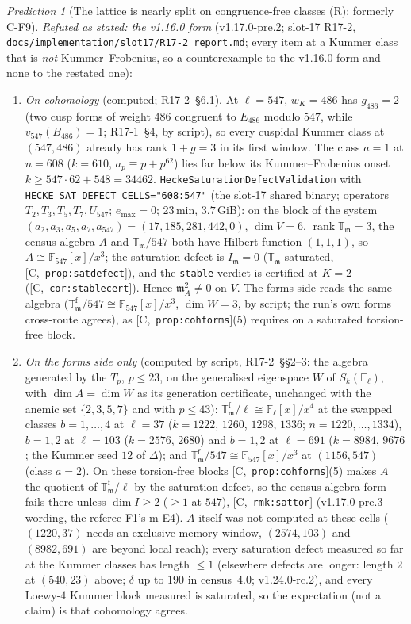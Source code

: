 \documentclass[11pt]{article}
\theoremstyle{remark}
\newtheorem{prediction}[theorem]{Prediction}
\newcommand{\F}{\mathbb{F}}
\newcommand{\Fl}{\F_\ell}
\DeclareMathOperator{\rank}{rank}
\newcommand{\T}{\mathbb{T}}
\newcommand{\m}{\mathfrak{m}}
\newcommand{\HA}[1]{[C,~\texttt{#1}]}      %
\begin{document}
\begin{prediction}[The lattice is nearly split on congruence-free classes (R); formerly C-F9]
\emph{Refuted as stated: the v1.16.0 form} (v1.17.0-pre.2; slot-17 R17-2, \texttt{docs/implementation/slot17/R17-2\_report.md}; every item at a Kummer class
that is \emph{not} Kummer--Frobenius, so a counterexample to the v1.16.0 form and none to the restated one):
\begin{enumerate}
\item \emph{On cohomology} (computed; R17-2~\S6.1). At $\ell=547$, $w_K=486$ has $g_{486}=2$ (two cusp forms of weight $486$ congruent to $E_{486}$ modulo
  $547$, while $v_{547}(B_{486})=1$; R17-1~\S4, by script), so every cuspidal Kummer class at $(547,486)$ already has rank $1+g=3$ in its first window. The
  class $a=1$ at $n=608$ ($k=610$, $a_p\equiv p+p^{62}$) lies far below its Kummer--Frobenius onset $k\ge547\cdot62+548=34462$.
  \texttt{HeckeSaturationDefectValidation} with \texttt{HECKE\_SAT\_DEFECT\_CELLS="608:547"} (the slot-17 shared binary; operators $T_2,T_3,T_5,T_7,U_{547}$;
  $e_{\max}=0$; 23\,min, $3.7$\,GiB): on the block of the system $(a_2,a_3,a_5,a_7,a_{547})=(17,185,281,442,0)$, $\dim V=6$, $\rank\T_\m=3$, the census algebra
  $A$ and $\T_\m/547$ both have Hilbert function $(1,1,1)$, so $A\cong\F_{547}[x]/x^3$; the saturation defect is $I_\m=0$ ($\T_\m$ saturated, \HA{prop:satdefect}),
  and the \texttt{stable} verdict is certified at $K=2$ (\HA{cor:stablecert}). Hence $\m_A^2\ne0$ on $V$. The forms side reads the same algebra
  ($\T^{\mathrm f}_\m/547\cong\F_{547}[x]/x^3$, $\dim W=3$, by script; the run's own forms cross-route agrees), as \HA{prop:cohforms}(5) requires on a saturated
  torsion-free block.
\item \emph{On the forms side only} (computed by script, R17-2~\S\S2--3: the algebra generated by the $T_p$, $p\le23$, on the generalised eigenspace $W$ of
  $S_k(\Fl)$, with $\dim A=\dim W$ as its generation certificate, unchanged with the anemic set $\{2,3,5,7\}$ and with $p\le43$): $\T^{\mathrm f}_\m/\ell\cong
  \Fl[x]/x^4$ at the swapped classes $b=1,\dots,4$ at $\ell=37$ ($k=1222$, $1260$, $1298$, $1336$; $n=1220,\dots,1334$), $b=1,2$ at $\ell=103$ ($k=2576$, $2680$)
  and $b=1,2$ at $\ell=691$ ($k=8984$, $9676$; the Kummer seed $12$ of $\Delta$); and $\T^{\mathrm f}_\m/547\cong\F_{547}[x]/x^3$ at $(1156,547)$ (class $a=2$).
  On these torsion-free blocks \HA{prop:cohforms}(5) makes $A$ the quotient of $\T^{\mathrm f}_\m/\ell$ by the saturation defect, so the census-algebra form fails
  there unless $\dim I\ge2$ ($\ge1$ at $547$), \HA{rmk:sattor} (v1.17.0-pre.3 wording, the referee F1's m-E4). $A$ itself was not computed at these cells ($(1220,37)$ needs an exclusive memory window, $(2574,103)$
  and $(8982,691)$ are beyond local reach); every saturation defect measured so far at the Kummer classes has length $\le1$ (elsewhere defects are
  longer: length $2$ at $(540,23)$ above; $\delta$ up to $190$ in census~4.0; v1.24.0-rc.2), and every Loewy-$4$ Kummer block measured is saturated, so
  the expectation (not a claim) is that cohomology agrees.
\end{enumerate}


\end{prediction}
\end{document}
